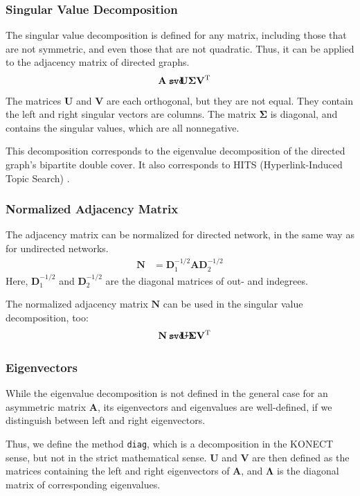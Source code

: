 \documentclass{article}
\def\mathnote#1{%
  \tag*{\rlap{\hspace\marginparsep\smash{\parbox[t]{\marginparwidth}{#1}}}}
}
\begin{document}
\subsubsection{Singular Value Decomposition}
The singular value decomposition is defined for any matrix, including
those that are not symmetric, and even those that are not quadratic.
Thus, it can be applied to the adjacency matrix of directed graphs. 
\begin{align}
  \mathnote{\texttt{svd}}
  \mathbf A &= \mathbf U \mathbf \Sigma \mathbf V^{\mathrm T}
\end{align}
The matrices $\mathbf U$ and $\mathbf V$ are each orthogonal, but they
are not equal.  They contain the left and right singular vectors are
columns.  The matrix $\mathbf \Sigma$ is diagonal, and contains the
singular values, which are all nonnegative. 

This decomposition corresponds to the eigenvalue decomposition of the
directed graph's bipartite double cover. 
It also corresponds to HITS (Hyperlink-Induced Topic Search) \cite{b27}.

\subsubsection{Normalized Adjacency Matrix}
The adjacency matrix can be normalized for directed network, in the same
way as for undirected networks.
\begin{align}
  \mathbf N &= \mathbf D_1^{-1/2} \mathbf A \mathbf D_2^{-1/2}
\end{align}
Here, $\mathbf D_1^{-1/2}$ and $\mathbf D_2^{-1/2}$
are the diagonal matrices of out- and indegrees. 

The normalized adjacency matrix $\mathbf N$ can be used in the singular
value decomposition, too:
\begin{align}
  \mathnote{\texttt{svd-n}}
  \mathbf N &= \mathbf U \mathbf \Sigma \mathbf V^{\mathrm T}
\end{align}

\subsubsection{Eigenvectors}
While the eigenvalue decomposition is not defined in the general case
for an asymmetric matrix $\mathbf A$, its eigenvectors and eigenvalues
are well-defined, if we distinguish between left and right
eigenvectors.

Thus, we define the method \texttt{diag}, which is a decomposition in
the KONECT sense, but not in the strict mathematical sense. 
$\mathbf U$ and $\mathbf V$ are then defined as the matrices containing
the left and right eigenvectors of $\mathbf A$, and $\mathbf \Lambda$ is
the diagonal matrix of corresponding eigenvalues. 
\end{document}
